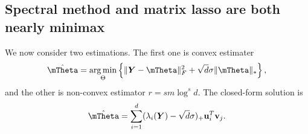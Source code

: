 \documentclass[final,12pt]{colt2020} %
\newtheorem{thm}{Theorem}[section]
\newtheorem{prop}{Proposition}
\def\rank{\textup{Trank}}
\begin{document}

\subsection{Spectral method and matrix lasso are both nearly minimax}
We now consider two estimations. The first one is convex estimater
\[
\hat \mTheta= \argmin_{\Theta}\left\{\FnormSize{}{\mY-\mTheta}^2+\sqrt{d}\sigma\nnormSize{}{\mTheta}\right\},
\]
and the other is non-convex estimator $r=sm\log^{s} d$. 
The closed-form solution is
\[
\hat \mTheta=\sum_{i=1}^{d}(\lambda_i(\mY)-\sqrt{d}\sigma)_{+}\mathbf{u}^T_i\mathbf{v}_j.
\]
\end{document}
